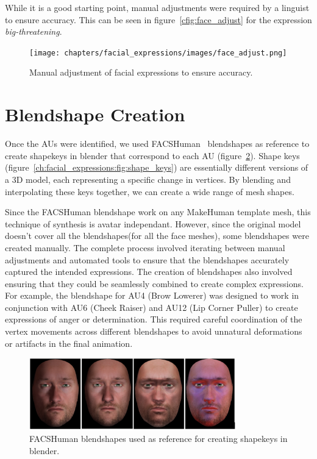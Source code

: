 \documentclass[../../main]{subfiles}
\begin{document}
While it is a good starting point, manual adjustments were required by a linguist to ensure accuracy. This can be seen in figure~\ref{cfig:face_adjust} for the expression \emph{big-threatening}.

\begin{figure}
    \centering
    \texttt{[image: chapters/facial\_expressions/images/face\_adjust.png]}
    \caption{Manual adjustment of facial expressions to ensure accuracy.}
    \label{ch:facial_expressions:fig:face_adjust}
\end{figure}

\section{Blendshape Creation}
\label{ch:facial_expressions:blendshape_creation}

Once the AUs were identified, we used FACSHuman~\cite{gilbert2021facshuman} blendshapes as reference to create shapekeys in blender that correspond to each AU (figure~\ref{ch:facial_expressions:fig:facshuman_blendshapes}). Shape keys (figure~\ref{ch:facial_expressions:fig:shape_keys}) are essentially different versions of a 3D model, each representing a specific change in vertices. By blending and interpolating these keys together, we can create a wide range of mesh shapes.

Since the FACSHuman blendshape work on any MakeHuman template mesh, this technique of synthesis is avatar independant. However, since the original model doesn't cover all the blendshapes(for all the face meshes), some blendshapes were created manually. The complete process involved iterating between manual adjustments and automated tools to ensure that the blendshapes accurately captured the intended expressions. The creation of blendshapes also involved ensuring that they could be seamlessly combined to create complex expressions. For example, the blendshape for AU4 (Brow Lowerer) was designed to work in conjunction with AU6 (Cheek Raiser) and AU12 (Lip Corner Puller) to create expressions of anger or determination. This required careful coordination of the vertex movements across different blendshapes to avoid unnatural deformations or artifacts in the final animation.

\begin{figure}
    \centering
    \includegraphics[width=0.8\textwidth]{chapters/facial_expressions/images/facshuman_blendshapes.png}
    \caption{FACSHuman blendshapes used as reference for creating shapekeys in blender.}
    \label{ch:facial_expressions:fig:facshuman_blendshapes}
\end{figure}
\end{document}

